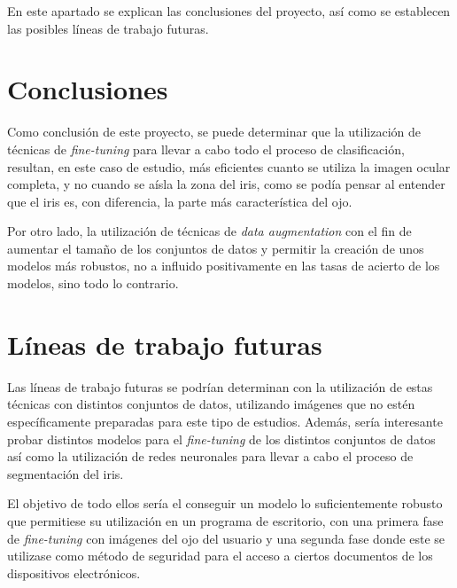  \label{capitulo7}

En este apartado se explican las conclusiones del proyecto, así como se establecen las posibles líneas de trabajo futuras.

\section{Conclusiones}

Como conclusión de este proyecto, se puede determinar que la utilización de técnicas de \textit{fine-tuning} para llevar a cabo todo el proceso de clasificación,
resultan, en este caso de estudio, más eficientes cuanto se utiliza la imagen ocular completa, y no cuando se aísla la zona del iris, como se podía pensar al entender
que el iris es, con diferencia, la parte más característica del ojo. 

Por otro lado, la utilización de técnicas de \textit{data augmentation} con el fin de aumentar el tamaño de los conjuntos de datos y permitir la creación de unos modelos más robustos,
no a influido positivamente en las tasas de acierto de los modelos, sino todo lo contrario.


\section{Líneas de trabajo futuras}

Las líneas de trabajo futuras se podrían determinan con la utilización de estas técnicas con distintos conjuntos de datos, utilizando imágenes que no estén específicamente preparadas
para este tipo de estudios. Además, sería interesante probar distintos modelos para el \textit{fine-tuning} de los distintos conjuntos de datos así como la utilización de redes neuronales
para llevar a cabo el proceso de segmentación del iris.

El objetivo de todo ellos sería el conseguir un modelo lo suficientemente robusto
que permitiese su utilización en un programa de escritorio, con una primera fase de \textit{fine-tuning} con imágenes del ojo del usuario y una segunda fase donde este 
se utilizase como método de seguridad para el acceso a ciertos documentos de los dispositivos electrónicos.
